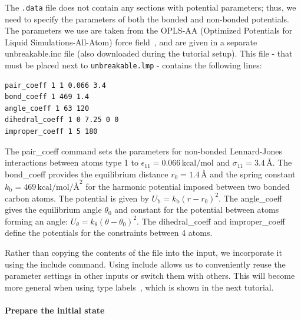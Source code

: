 \documentclass[9pt,tutorial]{livecoms}
\newcommand{\lmpcmd}[1]{\colorbox{listing}{\textcolor{command}{\small{#1}}}} %
\newcommand{\flecmd}[1]{\textcolor{command}{\texttt{#1}}} %
\begin{document}
The \flecmd{.data} file does not contain any sections with potential parameters; thus,
we need to specify the parameters of both the bonded and
non-bonded potentials.  The parameters we use are taken
from the OPLS-AA (Optimized Potentials for Liquid Simulations-All-Atom)
force field~\cite{jorgensenDevelopmentTestingOPLS1996}, and are given
in a separate \lmpcmd{unbreakable.inc} file (also downloaded during
the tutorial setup).  This file - that must be placed
next to \flecmd{unbreakable.lmp} - contains the following lines:
\begin{lstlisting}
pair_coeff 1 1 0.066 3.4
bond_coeff 1 469 1.4
angle_coeff 1 63 120
dihedral_coeff 1 0 7.25 0 0
improper_coeff 1 5 180
\end{lstlisting}
The \lmpcmd{pair\_coeff} command sets the parameters for non-bonded
Lennard-Jones interactions between atoms type 1 to
$\epsilon_{11} = 0.066 \, \text{kcal/mol}$ and
$\sigma_{11} = 3.4 \, \text{\AA{}}$.  The \lmpcmd{bond\_coeff} provides
the equilibrium distance $r_0= 1.4 \, \text{\AA{}}$ and the
spring constant $k_\text{b} = 469 \, \text{kcal/mol/\AA{}}^2$ for the
harmonic potential imposed between two bonded carbon atoms.  The potential
is given by $U_\text{b} = k_\text{b} ( r - r_0)^2$.  The
\lmpcmd{angle\_coeff} gives the equilibrium angle $\theta_0$ and
constant for the potential between atoms forming an angle:
$U_\theta = k_\theta ( \theta - \theta_0)^2$.  The
\lmpcmd{dihedral\_coeff} and \lmpcmd{improper\_coeff} define the potentials
for the constraints between 4 atoms.

\begin{note}
  Rather than copying the contents of the file into the input, we
  incorporate it using the \lmpcmd{include} command.  Using \lmpcmd{include} allows
  us to conveniently reuse the parameter settings
  in other inputs or switch them with others.  This will become more general
  when using type labels~\cite{gissinger2024type}, which is shown in the next
  tutorial.
\end{note}

\paragraph{Prepare the initial state}
\end{document}
